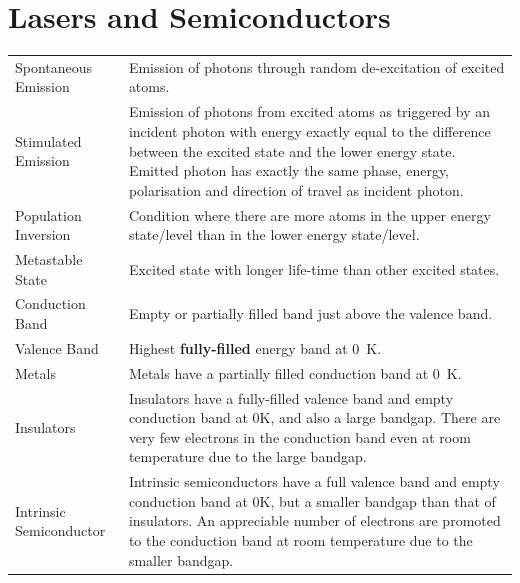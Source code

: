 \documentclass[a4paper,11pt]{article}
\begin{document}
	\section{Lasers and Semiconductors}
	\begin{center}
		\renewcommand{\arraystretch}{1.8}
		\begin{tabular}{@{} l p{10cm} @{}}
			\toprule
			Spontaneous Emission & Emission of photons through random de-excitation of excited atoms.\\
			Stimulated Emission & Emission of photons from excited atoms as triggered by an incident photon with energy exactly equal to the difference between the excited state and the lower energy state. Emitted photon has exactly the same phase, energy, polarisation and direction of travel as incident photon.\\
			Population Inversion & Condition where there are more atoms in the upper energy state/level than in the lower energy state/level.\\
			Metastable State & Excited state with longer life-time than other excited states.\\
			Conduction Band & Empty or partially filled band just above the valence band.\\
			Valence Band & Highest \textbf{fully-filled} energy band at \SI{0}{\kelvin}.\\
			Metals & Metals have a partially filled conduction band at \SI{0}{\kelvin}.\\
			Insulators & Insulators have a fully-filled valence band and empty conduction band at 0K, and also a large bandgap. There are very few electrons in the conduction band even at room temperature due to the large bandgap.\\
			Intrinsic Semiconductor & Intrinsic semiconductors have a full valence band and empty conduction band at 0K, but a smaller bandgap than that of insulators. An appreciable number of electrons are promoted to the conduction band at room temperature due to the smaller bandgap.\\
			\bottomrule
		\end{tabular}
	\end{center}
	\newpage
\end{document}
